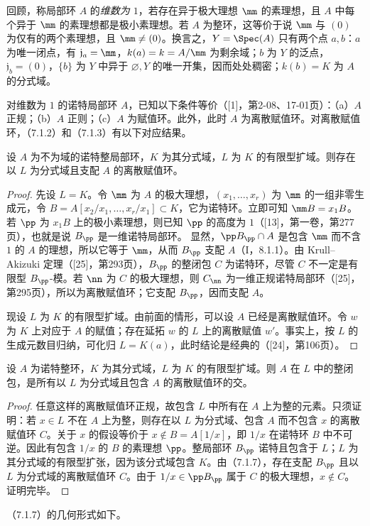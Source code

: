 回顾，称局部环 $A$ 的\emph{维数为 $1$}，若存在异于极大理想 $\mm$ 的素理想，且 $A$ 中每个异于 $\mm$ 的素理想都是极小素理想。若 $A$ 为整环，这等价于说 $\mm$ 与 $(0)$ 为仅有的两个素理想，且 $\mm\ne(0)$。换言之，$Y=\Spec(A)$ 只有两个点 $a,b$：$a$ 为唯一闭点，有 $\mathfrak j_a=\mm$，$k(a)=k=A/\mm$ 为剩余域；$b$ 为 $Y$ 的泛点，$\mathfrak j_b=(0)$，$\{b\}$ 为 $Y$ 中异于 $\varnothing,Y$ 的唯一开集，因而处处稠密；$k(b)=K$ 为 $A$ 的分式域。

对维数为 $1$ 的诺特局部环 $A$，已知以下条件等价（[1]，第2-08、17-01页）：（a）$A$ 正规；（b）$A$ 正则；（c）$A$ 为赋值环。此外，此时 $A$ 为离散赋值环。对离散赋值环，（7.1.2）和（7.1.3）有以下对应结果。

设 $A$ 为不为域的诺特整局部环，$K$ 为其分式域，$L$ 为 $K$ 的有限型扩域。则存在以 $L$ 为分式域且支配 $A$ 的离散赋值环。
\begin{proof}
先设 $L=K$。令 $\mm$ 为 $A$ 的极大理想，$(x_1,\ldots,x_r)$ 为 $\mm$ 的一组非零生成元，令 $B=A[x_2/x_1,\ldots,x_r/x_1]\subset K$，它为诺特环。立即可知 $\mm B=x_1B$。若 $\pp$ 为 $x_1B$ 上的极小素理想，则已知 $\pp$ 的高度为 $1$（[13]，第一卷，第277页），也就是说 $B_\pp$ 是一维诺特局部环。
显然，$\pp B_\pp\cap A$ 是包含 $\mm$ 而不含 $1$ 的 $A$ 的理想，所以它等于 $\mm$，从而 $B_\pp$ 支配 $A$（I，8.1.1）。由 Krull--Akizuki 定理（[25]，第293页），$B_\pp$ 的整闭包 $C$ 为诺特环，尽管 $C$ 不一定是有限型 $B_\pp$-模。若 $\nn$ 为 $C$ 的极大理想，则 $C_\nn$ 为一维正规诺特局部环（[25]，第295页），所以为离散赋值环；它支配 $B_\pp$，因而支配 $A$。

现设 $L$ 为 $K$ 的有限型扩域。由前面的情形，可以设 $A$ 已经是离散赋值环。令 $w$ 为 $K$ 上对应于 $A$ 的赋值；存在延拓 $w$ 的 $L$ 上的离散赋值 $w'$。事实上，按 $L$ 的生成元数目归纳，可化归 $L=K(a)$，此时结论是经典的（[24]，第106页）。
\end{proof}

设 $A$ 为诺特整环，$K$ 为其分式域，$L$ 为 $K$ 的有限型扩域。则 $A$ 在 $L$ 中的整闭包，是所有以 $L$ 为分式域且包含 $A$ 的离散赋值环的交。
\begin{proof}
任意这样的离散赋值环正规，故包含 $L$ 中所有在 $A$ 上为整的元素。只须证明：若 $x\in L$ 不在 $A$ 上为整，则存在以 $L$ 为分式域、包含 $A$ 而不包含 $x$ 的离散赋值环 $C$。关于 $x$ 的假设等价于 $x\notin B=A[1/x]$，即 $1/x$ 在诺特环 $B$ 中不可逆。因此有包含 $1/x$ 的 $B$ 的素理想 $\pp$。整局部环 $B_\pp$ 诺特且包含于 $L$；$L$ 为其分式域的有限型扩张，因为该分式域包含 $K$。由（7.1.7），存在支配 $B_\pp$ 且以 $L$ 为分式域的离散赋值环 $C$。由于 $1/x\in\pp B_\pp$ 属于 $C$ 的极大理想，$x\notin C$。证明完毕。
\end{proof}
（7.1.7）的几何形式如下。

